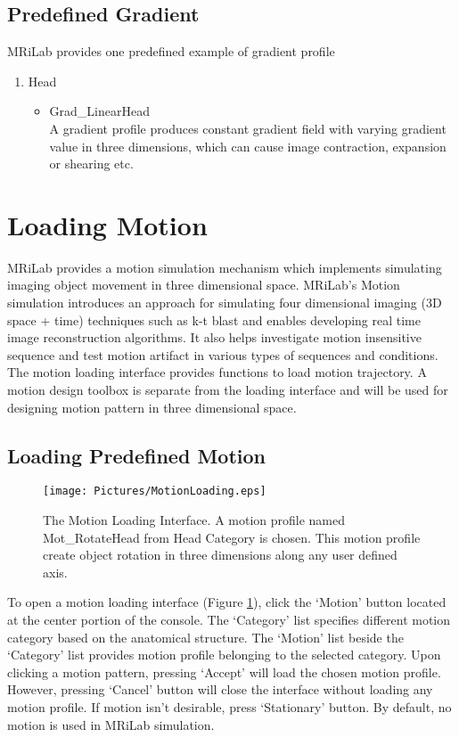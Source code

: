 \documentclass{book}%
\begin{document}
\subsection{Predefined Gradient}

MRiLab provides one predefined example of gradient profile

\begin{enumerate}
		\item Head
		\begin{itemize}
			\item Grad\_LinearHead \\
			A gradient profile produces constant gradient field with varying gradient value in three dimensions, which can cause image contraction, expansion or shearing etc.
		\end{itemize}
\end{enumerate}


\section{Loading Motion}
MRiLab provides a motion simulation mechanism which implements simulating imaging object movement in three dimensional space. MRiLab's Motion simulation introduces an approach for simulating four dimensional imaging (3D space + time) techniques such as k-t blast and enables developing real time image reconstruction algorithms. It also helps investigate motion insensitive sequence and test motion artifact in various types of sequences and conditions. The motion loading interface provides functions to load motion trajectory. A motion design toolbox is separate from the loading interface and will be used for designing motion pattern in three dimensional space.


\subsection{Loading Predefined Motion}

\begin{figure}[htbp]
	\centering
		\texttt{[image: Pictures/MotionLoading.eps]}
	\caption{The Motion Loading Interface. A motion profile named Mot\_RotateHead from Head Category is chosen. This motion profile create object rotation in three dimensions along any user defined axis.}
	\label{fig:MotionLoading}
\end{figure}

To open a motion loading interface (Figure \ref{fig:MotionLoading}), click the `Motion' button located at the center portion of the console. The `Category' list specifies different motion category based on the anatomical structure. The `Motion' list beside the `Category' list provides motion profile belonging to the selected category. Upon clicking a motion pattern, pressing `Accept' will load the chosen motion profile. However, pressing `Cancel' button will close the interface without loading any motion profile. If motion isn't desirable, press `Stationary' button. By default, no motion is used in MRiLab simulation. \\
\end{document}
